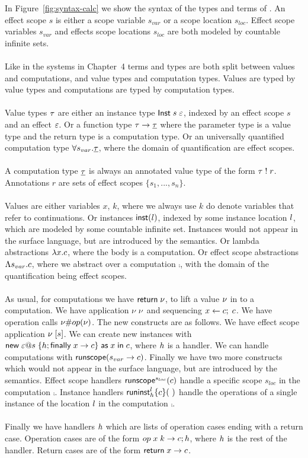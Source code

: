{In Figure~\ref{fig:syntax-calc} we show the syntax of the types and terms of \lang{}.
An effect scope $s$ is either a scope variable $s_{var}$ or a scope location $s_{loc}$.
Effect scope variables $s_{var}$ and effects scope locations $s_{loc}$ are both modeled by countable infinite sets.
\\\\
Like in the systems in Chapter~4 terms and types are both split between values and computations, and value types and computation types.
Values are typed by value types and computations are typed by computation types.
\\\\
Value types $\tau$ are either an instance type $\mathsf{Inst} \; s \; \varepsilon$, indexed by an effect scope $s$ and an effect $\varepsilon$.
Or a function type $\tau \rightarrow \underline{\tau}$ where the parameter type is a value type and the return type is a computation type.
Or an universally quantified computation type $\forall s_{var} . \underline{\tau}$, where the domain of quantification are effect scopes.
\\\\
A computation type $\underline{\tau}$ is always an annotated value type of the form $\tau \; ! \; r$.
Annotations $r$ are sets of effect scopes $\{ s_1, ..., s_n \}$.
\\\\
Values are either variables $x$, $k$, where we always use $k$ do denote variables that refer to continuations.
Or instances $\mathsf{inst}(l)$, indexed by some instance location $l$, which are modeled by some countable infinite set.
Instances would not appear in the surface language, but are introduced by the semantics.
Or lambda abstractions $\lambda x . c$, where the body is a computation.
Or effect scope abstractions $\Lambda s_{var} . c$, where we abstract over a computation $\comp$, with the domain of the quantification being effect scopes.
\\\\
As usual, for computations we have $\mathsf{return} \; \nu$, to lift a value $\nu$ in to a computation.
We have application $\nu \; \nu$ and sequencing $x \leftarrow c ;\; c$.
We have operation calls $\nu \# op(\nu)$.
The new constructs are as follows.
We have effect scope application $\nu \; [ s ]$.
We can create new instances with $\mathsf{new} \; \varepsilon @ s \; \{ h ; \mathsf{finally} \; x \rightarrow c \} \; \mathsf{as} \; x \;\mathsf{in}\; c$, where $h$ is a handler.
We can handle computations with $\mathsf{runscope} ( s_{var} \rightarrow c )$.
Finally we have two more constructs which would not appear in the surface language, but are introduced by the semantics.
Effect scope handlers $\mathsf{runscope}^{s_{loc}} ( c )$ handle a specific scope $s_{loc}$ in the computation $\comp$.
Instance handlers $\chandlei{\loc}{\handler}{\comp}$ handle the operations of a single instance of the location $l$ in the computation $\comp$.
\\\\
Finally we have handlers $h$ which are lists of operation cases ending with a return case.
Operation cases are of the form $op \; x \; k \rightarrow c ; h$, where $h$ is the rest of the handler.
Return cases are of the form $\mathsf{return} \; x \rightarrow c$.

}
